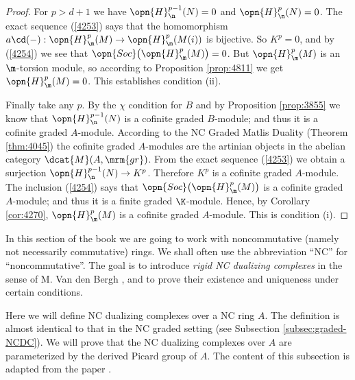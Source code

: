 \begin{proof}
For $p > d + 1$ we have 
$\opn{H}^{p - 1}_{\n}(N) = 0$ and 
$\opn{H}^{p}_{\n}(N) = 0$. 
The exact sequence (\ref{4253}) says that the homomorphism 
$a \cd (-) : \opn{H}^{p}_{\m}(M) \to \opn{H}^{p}_{\m}(M(i))$
is bijective. So $K^p = 0$, and by (\ref{4254}) we see that 
$\opn{Soc} \bigl( \opn{H}^{p}_{\m}(M) \bigr) = 0$. 
But $\opn{H}^{p}_{\m}(M)$ is an $\m$-torsion module, so according to 
Proposition \ref{prop:4811} we get $\opn{H}^{p}_{\m}(M) = 0$.
This establishes condition (ii). 

Finally take any $p$.
By the $\chi$ condition for $B$ and by Proposition \ref{prop:3855} we know 
that $\opn{H}^{p - 1}_{\n}(N)$ is a cofinite graded $B$-module; and thus it is 
a cofinite graded $A$-module. According to the NC Graded Matlis Duality 
(Theorem 
\ref{thm:4045}) the cofinite graded $A$-modules are the artinian objects in the 
abelian category $\dcat{M}(A, \mrm{gr})$.
From the exact sequence (\ref{4253}) we obtain a surjection 
$\opn{H}^{p - 1}_{\n}(N) \to K^p$.
Therefore $K^p$ is a cofinite graded $A$-module. 
The inclusion (\ref{4254}) says that 
$\opn{Soc} \bigl( \opn{H}^{p}_{\m}(M) \bigr)$ 
is a cofinite graded $A$-module; and thus it is a finite graded $\K$-module. 
Hence, by Corollary \ref{cor:4270}, 
$\opn{H}^{p}_{\m}(M)$ is a cofinite graded $A$-module.
This is condition (i). 
\end{proof}





\cleardoublepage
{} 
\label{sec:rigid-DC-NC} 

\AYcopyright 

In this section of the book we are going to work with noncommutative (namely 
not necessarily commutative) rings. We shall often use the 
abbreviation ``NC'' for ``noncommutative''. 
The goal is to introduce {\em rigid NC dualizing complexes} in the sense of M. 
Van den Bergh \cite{VdB}, and to prove their existence and uniqueness under 
certain conditions. 


\label{subsec:NC-DC}

Here we will define NC dualizing complexes over a NC ring $A$. 
The definition is almost identical to that in the NC graded setting (see 
Subsection \ref{subsec:graded-NCDC}). We will prove 
that the NC dualizing complexes over $A$ are 
parameterized by the derived Picard group of $A$. The content of this 
subsection is adapted from the paper \cite{Ye4}.

